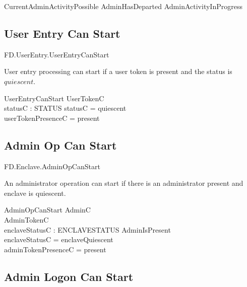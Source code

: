 \begin{zed}
        CurrentAdminActivityPossible 
        AdminHasDeparted \lor AdminActivityInProgress
\end{zed}



\subsection{User Entry Can Start}

\begin{traceunit}{FD.UserEntry.UserEntryCanStart}
\end{traceunit}

User entry processing can start if a user token is present and the
status is $quiescent$.

\begin{schema}{UserEntryCanStart}
        UserTokenC
\\      statusC : STATUS
\where
        statusC = quiescent
\\      userTokenPresenceC = present
\end{schema}


\subsection{Admin Op Can Start}

\begin{traceunit}{FD.Enclave.AdminOpCanStart}
\end{traceunit}

An administrator operation can start if there is an administrator
present and enclave is quiescent.

\begin{schema}{AdminOpCanStart}
        AdminC
\\      AdminTokenC
\\      enclaveStatusC : ENCLAVESTATUS
\where
        AdminIsPresent
\\      enclaveStatusC = enclaveQuiescent
\\      adminTokenPresenceC = present
\end{schema}


\subsection{Admin Logon Can Start}

